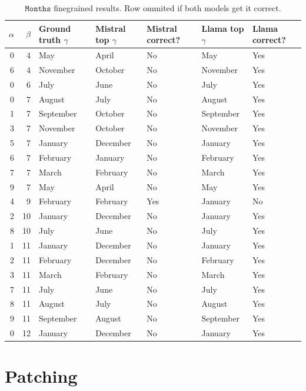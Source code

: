 \documentclass{article} %
\theoremstyle{plain}
\theoremstyle{definition}
\begin{document}
\begin{table}
\caption{$\texttt{Months}$ finegrained results. Row ommited if both models get it correct.}
\label{tab:months_finegrained}
\begin{tabular}{rrlllll}
\toprule
$\alpha$ & $\beta$ & Ground truth $\gamma$ & Mistral top $\gamma$ & Mistral correct? & Llama top $\gamma$ & Llama correct? \\
\midrule
0 & 4 & May & April & No & May & Yes \\
6 & 4 & November & October & No & November & Yes \\
0 & 6 & July & June & No & July & Yes \\
0 & 7 & August & July & No & August & Yes \\
1 & 7 & September & October & No & September & Yes \\
3 & 7 & November & October & No & November & Yes \\
5 & 7 & January & December & No & January & Yes \\
6 & 7 & February & January & No & February & Yes \\
7 & 7 & March & February & No & March & Yes \\
9 & 7 & May & April & No & May & Yes \\
4 & 9 & February & February & Yes & January & No \\
2 & 10 & January & December & No & January & Yes \\
8 & 10 & July & June & No & July & Yes \\
1 & 11 & January & December & No & January & Yes \\
2 & 11 & February & December & No & February & Yes \\
3 & 11 & March & February & No & March & Yes \\
7 & 11 & July & June & No & July & Yes \\
8 & 11 & August & July & No & August & Yes \\
9 & 11 & September & August & No & September & Yes \\
0 & 12 & January & December & No & January & Yes \\
\bottomrule
\end{tabular}
\end{table}




\section{Patching}
\end{document}
